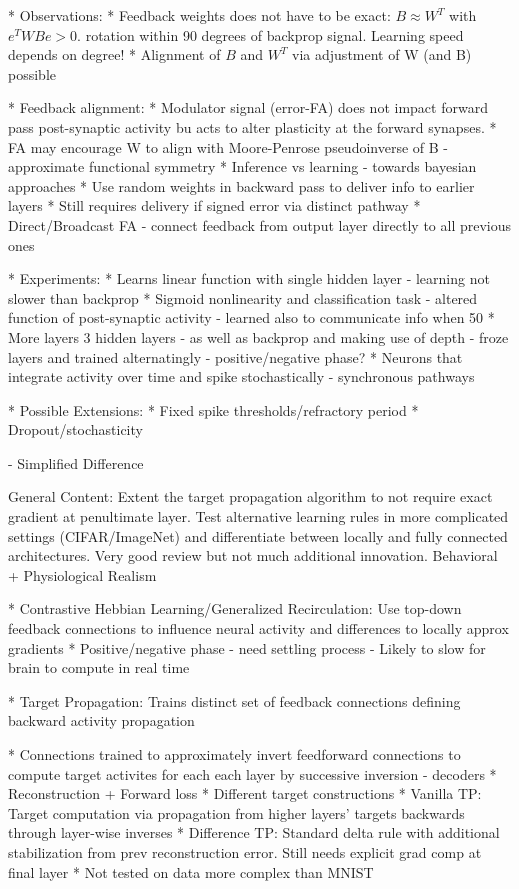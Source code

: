 \documentclass[colorinlistoftodos]{article}
\theoremstyle{definition}
\newcommand{\rob}[1]{\todo[color=red!40]{Rob: #1}}
\begin{document}
* Observations:
    * Feedback weights does not have to be exact: $B \approx W^T$ with $e^TWBe > 0$. rotation within 90 degrees of backprop signal. Learning speed depends on degree!
    * Alignment of $B$ and $W^T$ via adjustment of W (and B) possible

* Feedback alignment:
    * Modulator signal (error-FA) does not impact forward pass post-synaptic activity bu acts to alter plasticity at the forward synapses.
    * FA may encourage W to align with Moore-Penrose pseudoinverse of B - approximate functional symmetry
    * Inference vs learning - towards bayesian approaches
    * Use random weights in backward pass to deliver info to earlier layers
    * Still requires delivery if signed error via distinct pathway
    * Direct/Broadcast FA - connect feedback from output layer directly to all previous ones

* Experiments:
    * Learns linear function with single hidden layer - learning not slower than backprop
    * Sigmoid nonlinearity and classification task - altered function of post-synaptic activity - learned also to communicate info when 50%
    * More layers 3 hidden layers - as well as backprop and making use of depth - froze layers and trained alternatingly - positive/negative phase?
    * Neurons that integrate activity over time and spike stochastically - synchronous pathways

* Possible Extensions:
    * Fixed spike thresholds/refractory period
    * Dropout/stochasticity


\citet{lee2015, bartunov2018} - Simplified Difference

General Content: Extent the target propagation algorithm to not require exact gradient at penultimate layer. Test alternative learning rules in more complicated settings (CIFAR/ImageNet) and differentiate between locally and fully connected architectures. Very good review but not much additional innovation. Behavioral + Physiological Realism 

* Contrastive Hebbian Learning/Generalized Recirculation: Use top-down feedback connections to influence neural activity and differences to locally approx gradients
    * Positive/negative phase - need settling process - Likely to slow for brain to compute in real time

* Target Propagation: Trains distinct set of feedback connections defining backward activity propagation \rob{Write paragraphs for Target Propagation}

    * Connections trained to approximately invert feedforward connections to compute target activites for each each layer by successive inversion - decoders
        * Reconstruction + Forward loss
        * Different target constructions
    * Vanilla TP: Target computation via propagation from higher layers' targets backwards through layer-wise inverses
    * Difference TP: Standard delta rule with additional stabilization from prev reconstruction error. Still needs explicit grad comp at final layer
    * Not tested on data more complex than MNIST
\end{document}
